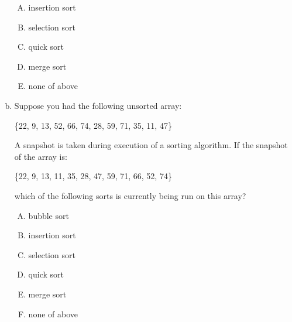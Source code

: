 \documentclass[11pt]{exam}
\begin{document}
\begin{enumerate}[(a)]
\begin{enumerate}[A)]
            \item insertion sort
            \item selection sort
            \item quick sort
            \item merge sort
            \item none of above
        \end{enumerate}
        \begin{solution}
        \end{solution}
    \item Suppose you had the following unsorted array:
        \begin{center}
            \{22, 9, 13, 52, 66, 74, 28, 59, 71, 35, 11, 47\}
        \end{center}
        A snapshot is taken during execution of a sorting algorithm. If the snapshot of the array is:
        \begin{center}
            \{22, 9, 13, 11, 35, 28, 47, 59, 71, 66, 52, 74\}
        \end{center}
        which of the following sorts is currently being run on this array?
        \begin{enumerate}[A)]
            \item bubble sort
            \item insertion sort
            \item selection sort
            \item quick sort
            \item merge sort
            \item none of above
        \end{enumerate}
        \begin{solution}
        \end{solution}
\end{enumerate}
\end{document}
